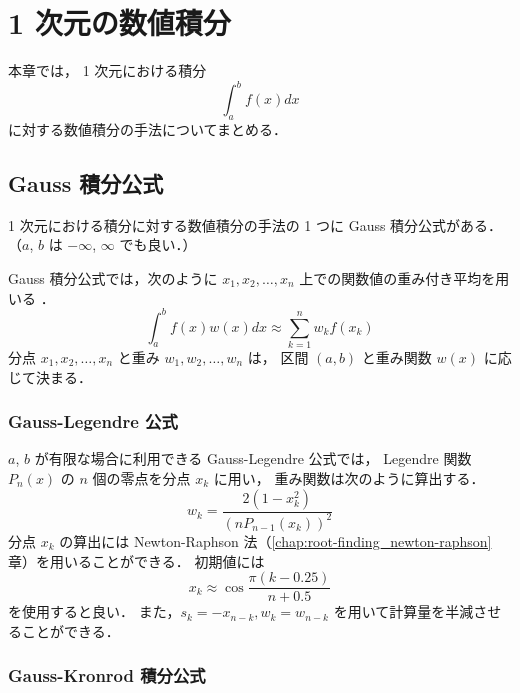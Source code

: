 %

\chapter{1 次元の数値積分}

本章では，
1 次元における積分
\begin{equation}
    \int_{a}^{b} f(x) dx
\end{equation}
に対する数値積分の手法についてまとめる．

\section{Gauss 積分公式}

1 次元における積分に対する数値積分の手法の 1 つに
 Gauss 積分公式がある．
（$a$, $b$ は $-\infty$, $\infty$ でも良い．）

Gauss 積分公式では，次のように $x_1, x_2, \ldots, x_n$ 上での関数値の重み付き平均を用いる
\cite{Mori1993}．
\begin{equation}
    \int_{a}^{b} f(x) w(x) dx \approx \sum_{k = 1}^n w_k f(x_k)
    \label{eq:integration_one-dim_gauss-general}
\end{equation}
分点 $x_1, x_2, \ldots, x_n$ と重み $w_1, w_2, \ldots, w_n$ は，
区間 $(a, b)$ と重み関数 $w(x)$ に応じて決まる．

\subsection{Gauss-Legendre 公式}\label{sec:integration_one-dim_gauss-legendre}

$a$, $b$ が有限な場合に利用できる
Gauss-Legendre 公式では，
Legendre 関数 $P_n(x)$ の $n$ 個の零点を分点 $x_k$ に用い，
重み関数は次のように算出する\cite{Mori1993}．
\begin{equation}
    w_k = \frac{2(1 - x_k^2)}{(n P_{n-1}(x_k))^2}
\end{equation}
分点 $x_k$ の算出には Newton-Raphson 法（\ref{chap:root-finding_newton-raphson} 章）を用いることができる．
初期値には
\begin{equation}
    x_k \approx \cos{\frac{\pi (k - 0.25)}{n + 0.5}}
\end{equation}
を使用すると良い\cite{Mori1993}．
また，$s_k = -x_{n-k}, w_k = w_{n-k}$ を用いて計算量を半減させることができる．

\subsection{Gauss-Kronrod 積分公式}\label{sec:integration_one-dim_gauss-kronrod}


